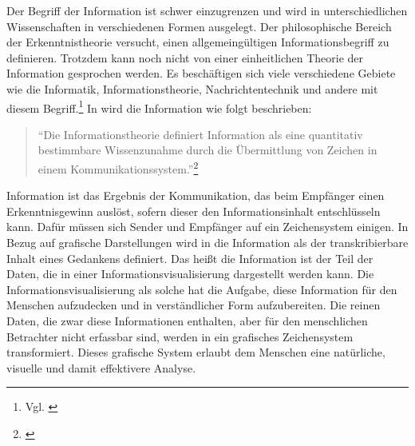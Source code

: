 \documentclass[a4paper, 
               12pt,
               DIV=calc,
               version=first,
               pdftex,
               headsepline,
               footsepline,
               bibtotocnumbered,
               liststotocnumbered]{scrreprt}
\begin{document}
Der Begriff der Information ist schwer einzugrenzen und wird in unterschiedlichen Wissenschaften
in verschiedenen Formen ausgelegt. Der philosophische Bereich der Erkenntnistheorie versucht,
einen allgemeingültigen Informationsbegriff zu definieren. Trotzdem kann noch nicht von einer
einheitlichen Theorie der Information gesprochen werden. Es beschäftigen sich viele verschiedene
Gebiete wie die Informatik, Informationstheorie, Nachrichtentechnik und andere mit diesem
Begriff.\footnote{Vgl. \citep{wiki_info}} In \cite{Hoeher} wird die Information wie folgt beschrieben:
\begin{quote}
"`Die Informationstheorie definiert Information als eine quantitativ bestimmbare Wissenzunahme durch
die Übermittlung von Zeichen in einem Kommunikationssystem."'\footnote{\citep[S.\,3]{Hoeher}}
\end{quote}
Information ist das Ergebnis der Kommunikation, das beim Empfänger einen Erkenntnisgewinn auslöst,
sofern dieser den Informationsinhalt entschlüsseln kann. Dafür müssen sich Sender und Empfänger
auf ein Zeichensystem einigen.
In Bezug auf grafische Darstellungen wird in \cite{Bertin} die Information als der transkribierbare
Inhalt eines Gedankens definiert. Das heißt die Information ist der Teil der Daten, die in einer
Informationsvisualisierung dargestellt werden kann. Die Informationsvisualisierung als solche hat die
Aufgabe, diese Information für den Menschen aufzudecken und in verständlicher Form aufzubereiten.
Die reinen Daten, die zwar diese Informationen enthalten,
aber für den menschlichen Betrachter nicht erfassbar sind, werden in ein grafisches
Zeichensystem transformiert. Dieses grafische System erlaubt dem Menschen eine natürliche, visuelle und
damit effektivere Analyse.
\end{document}
